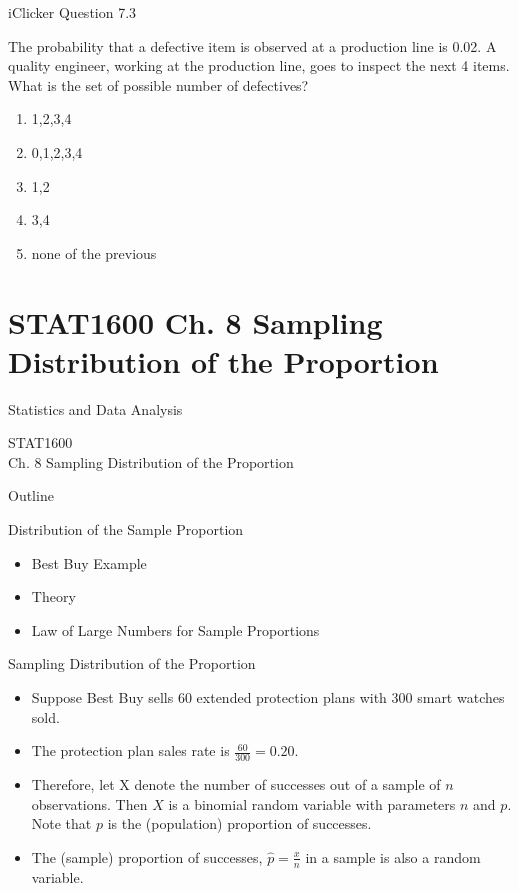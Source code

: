\documentclass[14pt]{beamer}\usepackage[]{graphicx}\usepackage[]{color}
\begin{document}
\begin{frame}[fragile]{iClicker Question 7.3}

The probability that a defective item is observed at a production line  is 0.02. A quality engineer, working at the production line, goes to inspect the next 4 items.  What is the set of possible number of defectives?

\begin{enumerate}
\item {1,2,3,4}
\item {0,1,2,3,4}
\item {1,2}
\item {3,4}
\item none of the previous
\end{enumerate}
\end{frame}



\section{STAT1600 Ch. 8 Sampling Distribution of the Proportion}

\begin{frame}[fragile]{Statistics and Data Analysis}

STAT1600 \\ Ch. 8 Sampling Distribution of the Proportion

\end{frame}

\begin{frame}[fragile]{Outline}

Distribution of the Sample Proportion  

\begin{itemize}
\item Best Buy Example
\item Theory
\item Law of Large Numbers for Sample Proportions
\end{itemize}
\end{frame}

\begin{frame}[fragile]{Sampling Distribution of the Proportion}

\begin{itemize}
\item<1-> Suppose Best Buy sells 60 extended protection plans with 300 smart watches sold.

\item<2-> The protection plan sales rate is  $\frac{60}{300} = 0.20$.

\item<3-> Therefore, let X denote the number of successes out of a sample  of $n$ observations. Then $X$ is a binomial random variable with  parameters $n$ and $p$. Note that $p$ is the (population) proportion of  successes.

\item<4-> The (sample) proportion of successes, $\hat{p} = \frac{x}{n}$ in a sample is also a random variable.
\end{itemize}
\end{frame}
\end{document}
